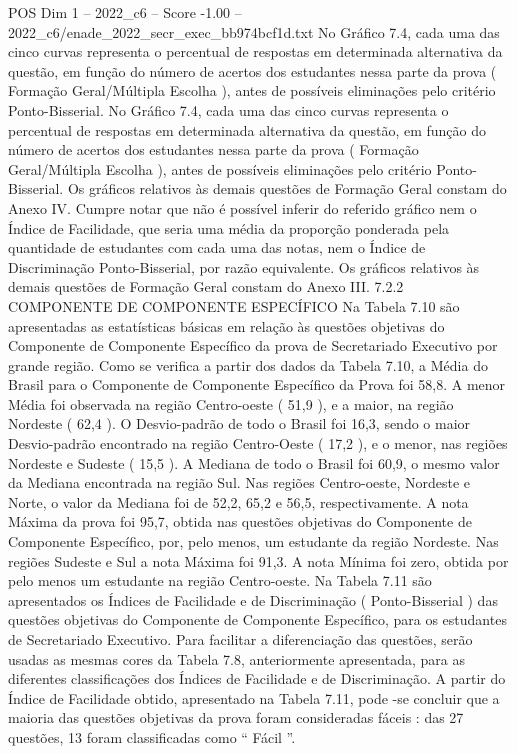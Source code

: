 \begin{textsample}{POS Dim 1 – 2022\_c6 – Score -1.00 – 2022\_c6/enade\_2022\_secr\_exec\_bb974bcf1d.txt}
No Gráfico 7.4, cada uma das cinco curvas representa o percentual de respostas em determinada alternativa da questão, em função do número de acertos dos estudantes nessa parte da prova ( Formação Geral/Múltipla Escolha ), antes de possíveis eliminações pelo critério Ponto-Bisserial.
No Gráfico 7.4, cada uma das cinco curvas representa o percentual de respostas em determinada alternativa da questão, em função do número de acertos dos estudantes nessa parte da prova ( Formação Geral/Múltipla Escolha ), antes de possíveis eliminações pelo critério Ponto-Bisserial.
Os gráficos relativos às demais questões de Formação Geral constam do Anexo IV.
Cumpre notar que não é possível inferir do referido gráfico nem o Índice de Facilidade, que seria uma média da proporção ponderada pela quantidade de estudantes com cada uma das notas, nem o Índice de Discriminação Ponto-Bisserial, por razão equivalente.
Os gráficos relativos às demais questões de Formação Geral constam do Anexo III. 7.2.2 COMPONENTE DE COMPONENTE ESPECÍFICO Na Tabela 7.10 são apresentadas as estatísticas básicas em relação às questões objetivas do Componente de Componente Específico da prova de Secretariado Executivo por grande região.
Como se verifica a partir dos dados da Tabela 7.10, a Média do Brasil para o Componente de Componente Específico da Prova foi 58,8.
A menor Média foi observada na região Centro-oeste ( 51,9 ), e a maior, na região Nordeste ( 62,4 ).
O Desvio-padrão de todo o Brasil foi 16,3, sendo o maior Desvio-padrão encontrado na região Centro-Oeste ( 17,2 ), e o menor, nas regiões Nordeste e Sudeste ( 15,5 ).
A Mediana de todo o Brasil foi 60,9, o mesmo valor da Mediana encontrada na região Sul.
Nas regiões Centro-oeste, Nordeste e Norte, o valor da Mediana foi de 52,2, 65,2 e 56,5, respectivamente.
A nota Máxima da prova foi 95,7, obtida nas questões objetivas do Componente de Componente Específico, por, pelo menos, um estudante da região Nordeste.
Nas regiões Sudeste e Sul a nota Máxima foi 91,3.
A nota Mínima foi zero, obtida por pelo menos um estudante na região Centro-oeste.
Na Tabela 7.11 são apresentados os Índices de Facilidade e de Discriminação ( Ponto-Bisserial ) das questões objetivas do Componente de Componente Específico, para os estudantes de Secretariado Executivo.
Para facilitar a diferenciação das questões, serão usadas as mesmas cores da Tabela 7.8, anteriormente apresentada, para as diferentes classificações dos Índices de Facilidade e de Discriminação.
A partir do Índice de Facilidade obtido, apresentado na Tabela 7.11, pode -se concluir que a maioria das questões objetivas da prova foram consideradas fáceis : das 27 questões, 13 foram classificadas como “ Fácil ”.

\end{textsample}
